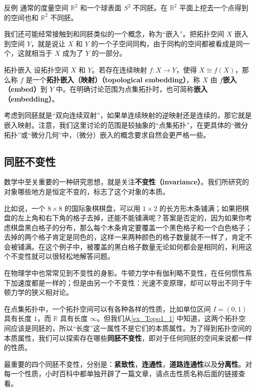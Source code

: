 \begin{example}{反例}\label{ex_Topo1_3}
通常的度量空间 $\mathbb{R}^2$ 和一个球表面 $S^2$ 不同胚。在 $\mathbb{R}^2$ 平面上挖去一个点得到的空间也和 $\mathbb{R}^2$ 不同胚。
\end{example}

我们还可能经常接触到和同胚类似的一个概念，称为“嵌入”。把拓扑空间 $X$ 嵌入到空间 $Y$，就是说让 $X$ 和 $Y$ 的一个子空间同构，由于同构的空间都被看成是同一个，这就相当于 $X$ 成为了 $Y$ 的一部分。

\begin{definition}{拓扑嵌入}
设拓扑空间 $X$ 和 $Y$。若存在连续映射 $f:X\rightarrow Y$，使得 $X\cong f(X)$，那么称 $f$ 是一个\textbf{拓扑嵌入（映射）（topological embedding）}，称 $X$ 由 $f$\textbf{嵌入（embed）}到 $Y$ 中。在明确讨论范围为点集拓扑时，也可简称\textbf{嵌入（embedding）}。
\end{definition}

考虑到同胚就是“双向连续双射”，如果单连续映射的逆映射还是连续的，那它就是嵌入映射。注意，我们这里讨论的范围是较抽象的“点集拓扑”，在更具体的“微分拓扑”或“微分几何”中，（微分）嵌入的概念要求自然会更严格一些。




\subsection{同胚不变性}

数学中至关重要的一种研究思想，就是关注\textbf{不变性（invariance）}。我们所研究的对象哪些地方是恒定不变的，标志了这个对象的本质。

比如说，一个 $8\times8$ 的国际象棋棋盘，可以用 $1\times2$ 的长方形木条铺满；如果把棋盘的左上角和右下角的格子去掉，还能不能铺满呢？答案是否定的，因为如果你考虑棋盘黑白格子的分布，那么每个木条肯定要覆盖一个黑色格子和一个白色格子；去掉的两个格子肯定是同色的，这样一来两种颜色的格子数量就不一样了，肯定不会被铺满。在这个例子中，被覆盖的黑白格子数量无论如何都会是相同的，利用这个不变性就可以很轻松地解答问题。

在物理学中也常常见到不变性的身影。牛顿力学中有伽利略不变性，在任何惯性系下加速度都是一样的；但是由另一个不变性：光速不变原理，却可以导出不同于牛顿力学的狭义相对论。

在点集拓扑中，一个拓扑空间可以有各种各样的性质，比如单位区间 $I=(0,1)$ 具有长度 $1$，而 $\mathbb{R}$ 具有长度 $\infty$。但我们从\autoref{ex_Topo1_1} 中知道，这两个拓扑空间应该是同胚的，所以“长度”这一属性不是它们的本质属性。为了得到拓扑空间的本质属性，我们可以探索存在哪些\textbf{同胚不变性}，即对于任何同胚的空间来说都一样的性质。

最重要的四个同胚不变性，分别是：\textbf{紧致性}，\textbf{连通性}，\textbf{道路连通性}以及\textbf{分离性}。对每一个性质，小时百科中都单独开辟了一篇文章，请点击性质名称后面的链接查看。
